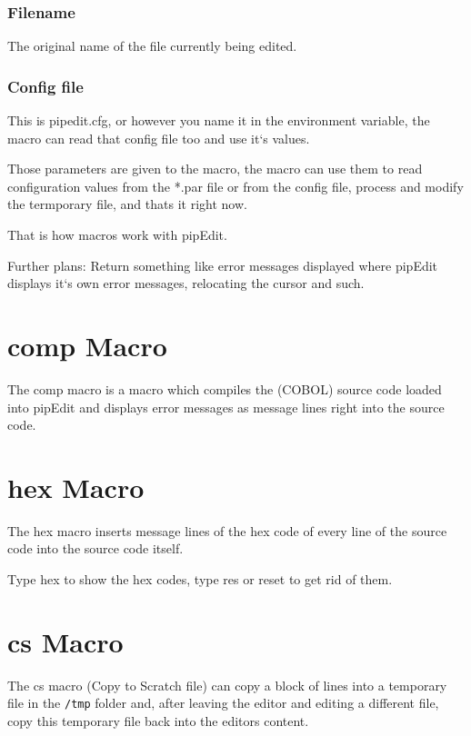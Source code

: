 \documentclass{report}
\begin{document}
\subsection{Filename}
The original name of the file currently being edited.

\subsection{Config file}
This is pipedit.cfg, or however you name it in the environment variable, the macro can read that config file too and use it‘s values.


Those parameters are given to the macro, the macro can use them to read configuration values from the *.par file or from the config file, process and modify the termporary file, and thats it right now.

That is how macros work with pipEdit.

Further plans: Return something like error messages displayed where pipEdit 
displays it‘s own error messages, relocating the cursor and such.

\chapter{comp Macro}
The comp macro is a macro which compiles the (COBOL) source code loaded into pipEdit and displays error messages as message lines right into the source code.



\chapter{hex Macro}

The hex macro inserts message lines of the hex code of every line of the source code into the source code itself.

Type hex to show the hex codes, type res or reset to get rid of them.



\chapter{cs Macro}

The cs macro (Copy to Scratch file) can copy a block of lines into a temporary
file in the \texttt{/tmp} folder and, after leaving the editor and editing a different file,  copy this temporary file back into the editors content. \\
\end{document}
